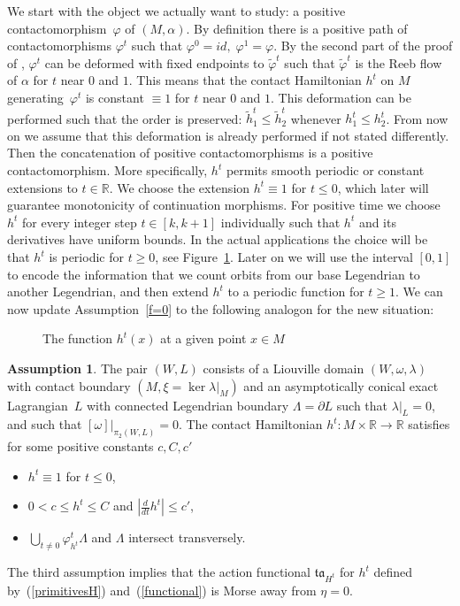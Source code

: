 \documentclass{amsart}
\newcommand{\tacal}{{\mathfrak{ta}}}
\newcommand{\RR}{\mathbb{R}}
\theoremstyle{definition}
\newtheorem{assumption}[proposition]{Assumption}
\theoremstyle{remark}
\numberwithin{equation}{section}
\begin{document}
We start with the object we actually want to study: a positive contactomorphism~$\varphi$ of $(M,\alpha)$. By definition there is a positive path of contactomorphisms $\varphi^t$ such that $\varphi^0=id,\;\varphi^1=\varphi$. By the second part of the proof of \cite[Proposition 6.2]{FLS15}, $\varphi^t$ can be deformed with fixed endpoints to $\tilde\varphi^t$ such that $\tilde\varphi^t$ is the Reeb flow of $\alpha$ for $t$ near $0$ and $1$. This means that the contact Hamiltonian $h^t$ on $M$ generating~$\varphi^t$ is constant $\equiv 1$ for $t$ near $0$ and $1$. This deformation can be performed such that the order is preserved: $\tilde h_1^t\leq\tilde h_2^t$ whenever $h_1^t\leq h_2^t$. From now on we assume that this deformation is already performed if not stated differently. 
Then the concatenation of positive contactomorphisms is a positive contactomorphism. More specifically, $h^t$ permits smooth periodic or constant extensions to $t\in\RR$. We choose the extension $h^t\equiv1$ for $t\leq0$, which later will guarantee monotonicity of continuation morphisms. For positive time we choose $h^t$ for every integer step $t\in[k,k+1]$ individually such that $h^t$ and its derivatives have uniform bounds. In the actual applications the choice will be that $h^t$ is periodic for $t\geq0$, see Figure~\ref{fig:ht}. Later on we will use the interval $[0,1]$ to encode the information that we count orbits from our base Legendrian to another Legendrian, and then extend $h^t$ to a periodic function for $t\geq 1$. We can now update Assumption~\ref{f=0} to the following analogon for the new situation:

\begin{figure}[h]
	\caption{The function $h^t(x)$ at a given point $x\in M$}
	\label{fig:ht}
\end{figure}

\begin{assumption}\label{classofh}
	The pair $(W,L)$ consists of a Liouville domain $(W,\omega,\lambda)$ with contact boundary $(M,\xi=\ker\lambda|_M)$ and an asymptotically conical exact Lagrangian~$L$ with connected Legendrian boundary $\Lambda=\partial L$ such that $\lambda|_L=0$, and such that $[\omega]|_{\pi_2(W,L)}=0$. The contact Hamiltonian $h^t:M\times\RR\to\RR$ satisfies for some positive constants $c,C,c'$
	\begin{itemize}
		\item $h^t\equiv 1$ for $t\leq0$,
		\item $0<c\leq h^t\leq C$ and $|\frac d{dt}h^t|\leq c'$,
		\item  $\bigcup_{t\neq 0}\varphi^t_{h^t}\Lambda$ and $\Lambda$ intersect transversely.
	\end{itemize}
\end{assumption}
The third assumption implies that the action functional $\tacal_{H^t}$ for $h^t$ defined by~(\ref{primitivesH}) and~(\ref{functional}) is Morse away from $\eta=0$.
\end{document}
